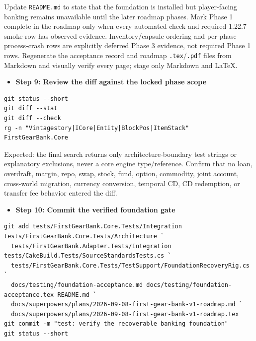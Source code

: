 \documentclass[
  10pt,
  letterpaper,
]{article}
\newcommand{\passthrough}[1]{#1}
\providecommand{\tightlist}{%
  \setlength{\itemsep}{0pt}\setlength{\parskip}{0pt}}
\begin{document}
Update \passthrough{\lstinline!README.md!} to state that the foundation
is installed but player-facing banking remains unavailable until the
later roadmap phases. Mark Phase 1 complete in the roadmap only when
every automated check and required 1.22.7 smoke row has observed
evidence. Inventory/capsule ordering and per-phase process-crash rows
are explicitly deferred Phase 3 evidence, not required Phase 1 rows.
Regenerate the acceptance record and roadmap
\passthrough{\lstinline!.tex!}/\passthrough{\lstinline!.pdf!} files from
Markdown and visually verify every page; stage only Markdown and LaTeX.

\begin{itemize}
\tightlist
\item[$\square$]
  \textbf{Step 9: Review the diff against the locked phase scope}
\end{itemize}

\begin{lstlisting}
git status --short
git diff --stat
git diff --check
rg -n "Vintagestory|ICore|Entity|BlockPos|ItemStack" FirstGearBank.Core
\end{lstlisting}

Expected: the final search returns only architecture-boundary test
strings or explanatory exclusions, never a core engine type/reference.
Confirm that no loan, overdraft, margin, repo, swap, stock, fund,
option, commodity, joint account, cross-world migration, currency
conversion, temporal CD, CD redemption, or transfer fee behavior entered
the diff.

\begin{itemize}
\tightlist
\item[$\square$]
  \textbf{Step 10: Commit the verified foundation gate}
\end{itemize}

\begin{lstlisting}
git add tests/FirstGearBank.Core.Tests/Integration tests/FirstGearBank.Core.Tests/Architecture `
  tests/FirstGearBank.Adapter.Tests/Integration tests/CakeBuild.Tests/SourceStandardsTests.cs `
  tests/FirstGearBank.Core.Tests/TestSupport/FoundationRecoveryRig.cs `
  docs/testing/foundation-acceptance.md docs/testing/foundation-acceptance.tex README.md `
  docs/superpowers/plans/2026-09-08-first-gear-bank-v1-roadmap.md `
  docs/superpowers/plans/2026-09-08-first-gear-bank-v1-roadmap.tex
git commit -m "test: verify the recoverable banking foundation"
git status --short
\end{lstlisting}
\end{document}
